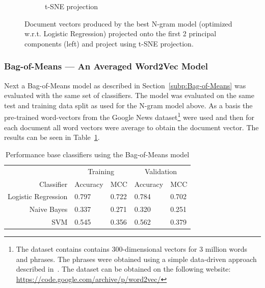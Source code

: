 \begin{figure}[h]
\begin{subfigure}[b]{0.48\textwidth}
      \caption{t-SNE projection}
\label{fig:exp-vector-space-ngram-tsne}
    \end{subfigure}
    \caption{Document vectors produced by the best N-gram model (optimized w.r.t. Logistic Regression) projected onto the first 2 principal components (left) and project using t-SNE projection.}
\label{fig:exp-vector-space-ngram}
\end{figure}

\subsubsection{Bag-of-Means --- An Averaged Word2Vec Model}

Next a Bag-of-Means model as described in Section~\ref{subp:Bag-of-Means} was evaluated with the same set of classifiers. The model was evaluated on the same test and training data split as used for the N-gram model above. As a basis the pre-trained word-vectors from the Google News dataset\footnote{The dataset contains contains 300-dimensional vectors for 3 million words and phrases. The phrases were obtained using a simple data-driven approach described in~\cite{Mikolov:2013ab}. The dataset can be obtained on the following website: \url{https://code.google.com/archive/p/word2vec/}} were used and then for each document all word vectors were average to obtain the document vector. The results can be seen in Table~\ref{tab:Bag-Of-Means Results}.

\begin{table}[h]
  \begin{center}
  \begin{tabular}{ r | *2l | *2l }
    \toprule
     & \multicolumn{2}{c|}{Training} & \multicolumn{2}{|c}{Validation}\\
    Classifier & Accuracy & MCC & Accuracy & MCC \\
    \midrule
    Logistic Regression & 0.797 & 0.722 & 0.784 & 0.702 \\
    Naive Bayes         & 0.337 & 0.271 & 0.320 & 0.251 \\
    SVM                 & 0.545 & 0.356 & 0.562 & 0.379 \\
    \bottomrule
  \end{tabular}
  \caption{Performance base classifiers using the Bag-of-Means model}
\label{tab:Bag-Of-Means Results}
\end{center}
\end{table}

